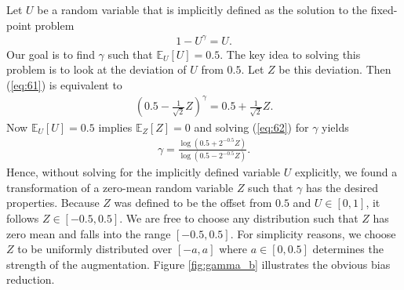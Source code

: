 \documentclass[10pt,twocolumn,letterpaper]{article}
\begin{document}
Let $U$ be a random variable that is implicitly defined as the solution to the fixed-point problem
\begin{align}
  \label{eq:61}
  1 - U^\gamma = U.
\end{align}
Our goal is to find $\gamma$ such that $\mathbb{E}_U[U] = 0.5$. 
The key idea to solving this problem is to look at the deviation of $U$ from $0.5$. 
Let $Z$ be this deviation. Then (\ref{eq:61}) is equivalent to 
\begin{align}
  \label{eq:62}
  \left(0.5 - \frac{1}{\sqrt{2}}Z \right)^\gamma = 0.5 + \frac{1}{\sqrt{2}}Z.
\end{align}
Now $\mathbb{E}_U[U] = 0.5$ implies $\mathbb{E}_Z[Z] = 0$ and solving (\ref{eq:62}) for $\gamma$ yields
\begin{align}
  \label{eq:63}
  \gamma = \frac{\log\left(0.5 + 2^{-0.5} Z\right)}{\log \left(0.5 - 2^{-0.5} Z\right)}.
\end{align}
Hence, without solving for the implicitly defined variable $U$ explicitly, we found a transformation of a zero-mean random variable $Z$ such that $\gamma$ has the desired properties. 
Because $Z$ was defined to be the offset from $0.5$ and $U \in [0, 1]$, it follows $Z \in [-0.5, 0.5]$.
We are free to choose any distribution such that $Z$ has zero mean and falls into the range $[-0.5, 0.5]$. 
For simplicity reasons, we choose $Z$ to be uniformly distributed over $[-a, a]$ where $a \in [0, 0.5]$ determines the strength of the augmentation. 
Figure \ref{fig:gamma_b} illustrates the obvious bias reduction.
\end{document}
